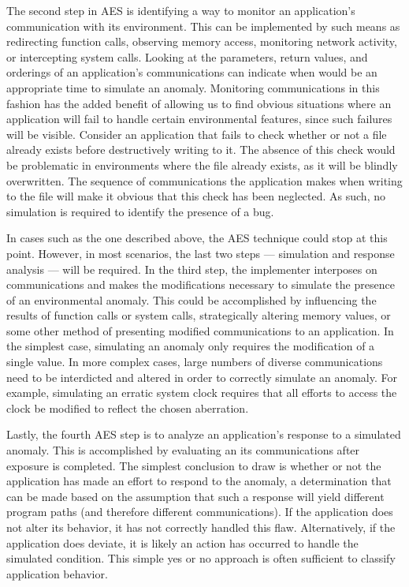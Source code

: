 The second step in AES
is identifying
a way to monitor an application's communication
with its environment.
This can be implemented
by such means as
redirecting function calls,
observing memory access,
monitoring network activity,
or intercepting system calls.
Looking at the parameters,
return values,
and orderings
of an application's communications
can indicate
when would be an appropriate time to simulate an anomaly.
Monitoring communications
in this fashion
has the added benefit
of allowing us to find obvious situations
where an application will fail
to handle certain environmental features,
since such failures will be visible.
Consider an application that fails to check whether or not
a file already exists
before destructively writing to it.
The absence of this check
would be problematic in environments where the file already exists,
as it will be blindly overwritten.
The sequence of communications
the application makes when writing to the file
will make it obvious that this check has been neglected.
As such,
no simulation is required to identify the presence of a bug.

In cases such as the one described above,
the AES technique could stop at this point.
However, in most scenarios,
the last two steps ---
simulation and response analysis ---
will be required.
In the third step,
the implementer
interposes on communications
and makes the modifications necessary
to simulate the presence
of an environmental anomaly.
This could be accomplished by
influencing the results of function calls or system calls,
strategically altering memory values,
or some other method
of presenting modified communications to an application.
In the simplest case,
simulating an anomaly only requires
the modification of a single value.
In more complex cases,
large numbers of diverse communications
need to be interdicted and altered
in order to correctly simulate an anomaly.
For example,
simulating an erratic system clock
requires that all efforts
to access the clock
be modified to reflect the chosen aberration.

Lastly, the fourth AES step
is to analyze an application's response
to a simulated anomaly.
This is accomplished
by evaluating an its communications
after exposure is completed.
The simplest conclusion to draw
is whether or not the application
has made an effort to respond
to the anomaly,
a determination that can be made based
on the assumption
that such a response will yield
different program paths (and therefore different communications).
If the application
does not alter its behavior, it has not
correctly handled this flaw.
Alternatively,
if the application does deviate,
it is likely
an action has occurred to handle the simulated condition.
This simple yes or no approach
is often sufficient
to classify application behavior.

